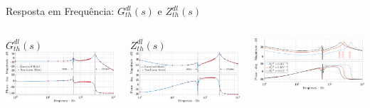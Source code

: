 \begin{frame}{Resposta em Frequência: $G_{th}^{dl}(s)$ e $Z_{th}^{dl}(s)$}

\begin{columns}

\centering
$G_{th}^{dl}(s)$\\[5pt]
\includegraphics[width=0.95\linewidth]{./figuras/figuras_nrf/bode_Gth}


\centering
$Z_{th}^{dl}(s)$\\[5pt]
\includegraphics[width=0.95\linewidth]{./figuras/figuras_nrf/bode_Zth}

\includegraphics[width=0.95\linewidth]{./figuras/figuras_var_gain/bode_Zth_vdl_nrf_var_kpv}

\end{columns}



\end{frame}

